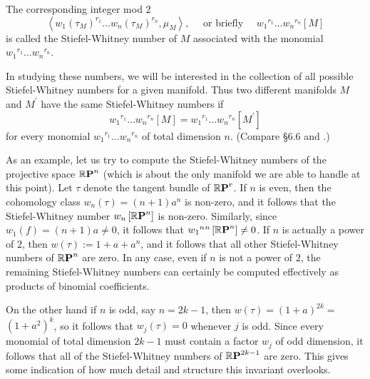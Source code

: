 \begin{definition}\label{def:4-2}
	The corresponding integer mod $2$
	\[
	\left\langle w_{1}\left(\tau_{M}\right)^{r_1} \dots w_{n}\left(\tau_{M}\right)^{r_n}, \mu_{M}\right\rangle,\quad \text{ or briefly }\quad{w}_{1}{ }^{r_1} \dots w_{n}{ }^{r_n}[M]
	\]
	is called the Stiefel-Whitney number of $M$ associated with the monomial $w_{1}{ }^{r_{1}} \dots w_{n}{ }^{r_n}$.
\end{definition}

In studying these numbers, we will be interested in the collection of all possible Stiefel-Whitney numbers for a given manifold. Thus two different manifolds $M$ and $M^{\prime}$ have the same Stiefel-Whitney numbers if 
\[w_{1}{ }^{r_{1}} \dots w_{n}{ }^{r_{n}} \left[M\right]=w_{1}{ }^{r_{1}} \dots w_{n} { }^{r_n}{\left[M^{\prime}\right]}\]
for every monomial ${w}_{1}{ }^{r_{1}} \dots w_{n}{ }^{r_n}$ of total dimension $n$. (Compare \S $6.6$ and .)

As an example, let us try to compute the Stiefel-Whitney numbers of the projective space $\boldsymbol{\mathbb{R}}\boldsymbol{\mathrm{P}}^{n}$ (which is about the only manifold we are able to handle at this point). Let $\tau$ denote the tangent bundle of $\boldsymbol{\mathbb{R}}\boldsymbol{\mathrm{P}}^{r}$. If $n$ is even, then the cohomology class $w_{n}(\tau)=(n+1) a^{n}$ is non-zero, and it follows that the Stiefel-Whitney number $w_{n}\left[\boldsymbol{\mathbb{R}}\boldsymbol{\mathrm{P}}^{n}\right]$ is non-zero. Similarly, since $w_{1}(f)=(n+1) a \neq 0$, it follows that $w_{1}{ }^{n}{ }^{n}\left[\boldsymbol{\mathbb{R}}\boldsymbol{\mathrm{P}}^{n}\right] \neq 0$. If $n$ is actually a power of $2$, then $w(\tau):=1+a+a^{n}$, and it follows that all other Stiefel-Whitney numbers of $\boldsymbol{\mathbb{R}}\boldsymbol{\mathrm{P}}^{n}$ are zero. In any case, even if $n$ is not a power of $2$, the remaining Stiefel-Whitney numbers can certainly be computed effectively as products of binomial coefficients.

On the other hand if $n$ is odd, say $n=2k-1$, then $w(\tau)=(1+a)^{2k} =$\linebreak$(1+a^{2})^{k}$, so it follows that $w_{j}(\tau)=0$ whenever $j$ is odd. Since every monomial of total dimension $2 k-1$ must contain a factor $w_{j}$ of odd dimension, it follows that all of the Stiefel-Whitney numbers of $\boldsymbol{\mathbb{R}}\boldsymbol{\mathrm{P}}^{2 k-1}$ are zero. This gives some indication of how much detail and structure this invariant overlooks.

